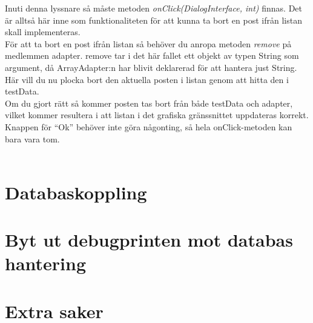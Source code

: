 \documentclass[11 pt]{article} %
\begin{document}
Inuti denna lyssnare så måste metoden \textit{onClick(DialogInterface, int)} finnas. Det är alltså här inne som funktionaliteten för att kunna ta bort en post ifrån listan skall implementeras.\\

För att ta bort en post ifrån listan så behöver du anropa metoden \textit{remove} på medlemmen adapter. remove tar i det här fallet ett objekt av typen String som argument, då ArrayAdapter:n har blivit deklarerad för att hantera just String. Här vill du nu plocka bort den aktuella posten i listan genom att hitta den i testData.\\  
Om du gjort rätt så kommer posten tas bort från både testData och adapter, vilket kommer resultera i att listan i det grafiska gränssnittet uppdateras korrekt.\\

Knappen för “Ok” behöver inte göra någonting, så hela onClick-metoden kan bara vara tom.\\ \\

\section{Databaskoppling}

\section{Byt ut debugprinten mot databas hantering}

\section{Extra saker}
\end{document}

